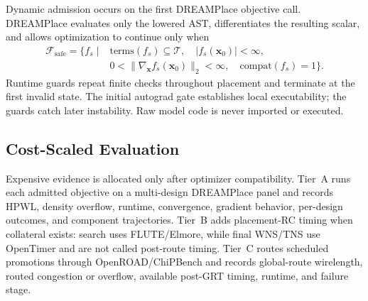Dynamic admission occurs on the first DREAMPlace objective call. DREAMPlace
evaluates only the lowered AST, differentiates the resulting scalar, and
allows optimization to continue only when
\begin{equation}
\begin{aligned}
\mathcal{F}_{\mathrm{safe}}=\{f_s\mid{}&
\mathrm{terms}(f_s)\subseteq\mathcal{T},\quad
|f_s(\mathbf{x}_0)|<\infty,\\
&0<\|\nabla_{\mathbf{x}}f_s(\mathbf{x}_0)\|_2<\infty,\quad
\mathrm{compat}(f_s)=1\}.
\end{aligned}
\label{eq:safe-family}
\end{equation}
Runtime guards repeat finite checks throughout placement and terminate at the
first invalid state. The initial autograd gate establishes local executability;
the guards catch later instability. Raw model code is never imported or
executed.

\subsection{Cost-Scaled Evaluation}
\label{sec:cascade}
\label{sec:proxy-audit}

Expensive evidence is allocated only after optimizer compatibility. Tier~A
runs each admitted objective on a multi-design DREAMPlace panel and records
HPWL, density overflow, runtime, convergence, gradient behavior, per-design
outcomes, and component trajectories. Tier~B adds placement-RC timing when
collateral exists: search uses FLUTE/Elmore, while final WNS/TNS use OpenTimer
and are not called post-route timing. Tier~C routes scheduled promotions
through OpenROAD/ChiPBench and records global-route wirelength, routed
congestion or overflow, available post-GRT timing, runtime, and failure stage.

